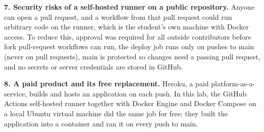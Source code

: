 \documentclass[conference]{IEEEtran}
\begin{document}
\textbf{7. Security risks of a self-hosted runner on a public repository.} Anyone can open a pull request, and a workflow from that pull request could run arbitrary code on the runner, which is the student's own machine with Docker access. To reduce this, approval was required for all outside contributors before fork pull-request workflows can run, the deploy job runs only on pushes to main (never on pull requests), main is protected so changes need a passing pull request, and no secrets or server credentials are stored in GitHub.

\textbf{8. A paid product and its free replacement.} Heroku, a paid platform-as-a-service, builds and hosts an application on each push. In this lab, the GitHub Actions self-hosted runner together with Docker Engine and Docker Compose on a local Ubuntu virtual machine did the same job for free: they built the application into a container and ran it on every push to main.
\end{document}
